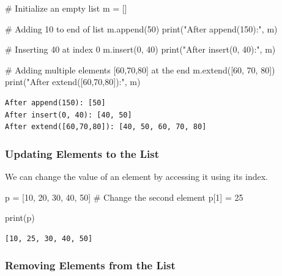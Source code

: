 \documentclass[
  letterpaper,
  DIV=11,
  numbers=noendperiod]{scrreprt}
\newenvironment{Shaded}{\begin{snugshade}}{\end{snugshade}}
\newcommand{\BuiltInTok}[1]{\textcolor[rgb]{0.00,0.23,0.31}{#1}}
\newcommand{\CommentTok}[1]{\textcolor[rgb]{0.37,0.37,0.37}{#1}}
\newcommand{\DecValTok}[1]{\textcolor[rgb]{0.68,0.00,0.00}{#1}}
\newcommand{\NormalTok}[1]{\textcolor[rgb]{0.00,0.23,0.31}{#1}}
\newcommand{\OperatorTok}[1]{\textcolor[rgb]{0.37,0.37,0.37}{#1}}
\newcommand{\StringTok}[1]{\textcolor[rgb]{0.13,0.47,0.30}{#1}}
\begin{document}
\begin{Shaded}
\begin{Highlighting}[]
\CommentTok{\# Initialize an empty list}
\NormalTok{m }\OperatorTok{=}\NormalTok{ []}

\CommentTok{\# Adding 10 to end of list}
\NormalTok{m.append(}\DecValTok{50}\NormalTok{)  }
\BuiltInTok{print}\NormalTok{(}\StringTok{"After append(150):"}\NormalTok{, m)  }

\CommentTok{\# Inserting 40 at index 0}
\NormalTok{m.insert(}\DecValTok{0}\NormalTok{, }\DecValTok{40}\NormalTok{)}
\BuiltInTok{print}\NormalTok{(}\StringTok{"After insert(0, 40):"}\NormalTok{, m) }

\CommentTok{\# Adding multiple elements  [60,70,80] at the end}
\NormalTok{m.extend([}\DecValTok{60}\NormalTok{, }\DecValTok{70}\NormalTok{, }\DecValTok{80}\NormalTok{])  }
\BuiltInTok{print}\NormalTok{(}\StringTok{"After extend([60,70,80]):"}\NormalTok{, m) }
\end{Highlighting}
\end{Shaded}

\begin{verbatim}
After append(150): [50]
After insert(0, 40): [40, 50]
After extend([60,70,80]): [40, 50, 60, 70, 80]
\end{verbatim}

\subsubsection{Updating Elements to the
List}\label{updating-elements-to-the-list}

We can change the value of an element by accessing it using its index.

\begin{Shaded}
\begin{Highlighting}[]
\NormalTok{p }\OperatorTok{=}\NormalTok{ [}\DecValTok{10}\NormalTok{, }\DecValTok{20}\NormalTok{, }\DecValTok{30}\NormalTok{, }\DecValTok{40}\NormalTok{, }\DecValTok{50}\NormalTok{]}
\CommentTok{\# Change the second element}
\NormalTok{p[}\DecValTok{1}\NormalTok{] }\OperatorTok{=} \DecValTok{25} 

\BuiltInTok{print}\NormalTok{(p)  }
\end{Highlighting}
\end{Shaded}

\begin{verbatim}
[10, 25, 30, 40, 50]
\end{verbatim}

\subsubsection{Removing Elements from the
List}\label{removing-elements-from-the-list}
\end{document}
